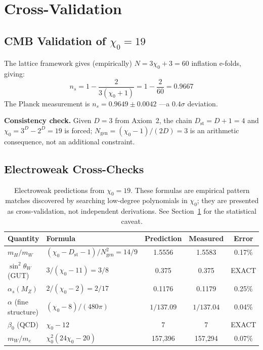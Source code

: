 \documentclass[12pt,a4paper]{article}
\newcommand{\chizero}{\chi_0}
\newcommand{\Dst}{D_{\mathrm{st}}}
\newcommand{\Ngen}{N_{\mathrm{gen}}}
\begin{document}
\section{Cross-Validation}\label{sec:validation}

\subsection{CMB Validation of \texorpdfstring{$\chizero = 19$}{chi0 = 19}}

The lattice framework gives (empirically) $N = 3\chizero + 3 = 60$ inflation e-folds, giving:
\begin{equation}
n_s = 1 - \frac{2}{3(\chizero + 1)} = 1 - \frac{2}{60} = 0.9667
\end{equation}
The Planck measurement is $n_s = 0.9649 \pm 0.0042$ \citep{Planck2018}---a $0.4\sigma$ deviation.

\textbf{Consistency check.} Given $D = 3$ from Axiom~2, the chain $\Dst = D + 1 = 4$ and $\chizero = 3^D - 2^D = 19$ is forced; $\Ngen = (\chizero - 1)/(2D) = 3$ is an arithmetic consequence, not an additional constraint.

\subsection{Electroweak Cross-Checks}

\begin{table}[h]
\centering
\begin{tabular}{llccc}
\toprule
Quantity & Formula & Prediction & Measured & Error \\
\midrule
$m_H/m_W$ & $(\chizero - \Dst - 1)/\Ngen^2 = 14/9$ & 1.5556 & 1.5583 & 0.17\% \\
$\sin^2\theta_W$ (GUT) & $3/(\chizero - 11) = 3/8$ & 0.375 & 0.375 & EXACT \\
$\alpha_s(M_Z)$ & $2/(\chizero - 2) = 2/17$ & 0.1176 & 0.1179 & 0.25\% \\
$\alpha$ (fine structure) & $(\chizero - 8)/(480\pi)$ & $1/137.09$ & $1/137.04$ & 0.04\% \\
$\beta_0$ (QCD) & $\chizero - 12$ & 7 & 7 & EXACT \\
$m_W/m_e$ & $\chizero^2(24\chizero - 20)$ & 157,396 & 157,294 & 0.07\% \\
\bottomrule
\end{tabular}
\caption{Electroweak predictions from $\chizero = 19$. These formulas are empirical pattern matches discovered by searching low-degree polynomials in $\chizero$; they are presented as cross-validation, not independent derivations. See Section~\ref{sec:validation} for the statistical caveat.}
\label{tab:ew}
\end{table}
\end{document}
